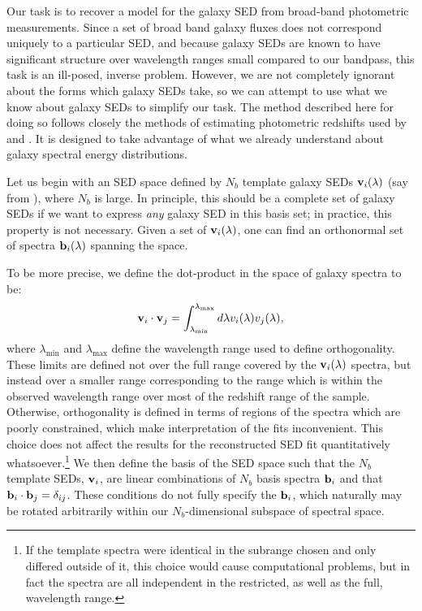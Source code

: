 \documentclass[10pt,preprint]{aastex}
\newcommand{\vv}[1]{{\bf #1}}
\begin{document}
Our task is to recover a model for the galaxy SED from broad-band
photometric measurements. Since a set of broad band galaxy fluxes does
not correspond uniquely to a particular SED, and because galaxy SEDs
are known to have significant structure over wavelength ranges small
compared to our bandpass, this task is an ill-posed, inverse
problem. However, we are not completely ignorant about the forms which
galaxy SEDs take, so we can attempt to use what we know about galaxy
SEDs to simplify our task.  The method described here for doing so
follows closely the methods of estimating photometric redshifts used
by \citet{csabai00a} and \citet{budavari00a}. It is designed to take
advantage of what we already understand about galaxy spectral energy
distributions.

Let us begin with an SED space defined by $N_b$ template galaxy SEDs
$\vv{v}_i(\lambda)$ (say from \citealt{bruzual93a}), where $N_b$ is
large. In principle, this should be a complete set of galaxy SEDs if
we want to express {\it any} galaxy SED in this basis set; in
practice, this property is not necessary.  Given a set of
$\vv{v}_i(\lambda)$, one can find an orthonormal set of spectra
$\vv{b}_i(\lambda)$ spanning the space. 

To be more precise, we define the dot-product in the space of galaxy
spectra to be:
\begin{equation}
\vv{v}_i \cdot \vv{v}_j =
\int_{\lambda_{\mathrm{min}}}^{\lambda_{\mathrm{max}}} d\lambda
v_i(\lambda) v_j(\lambda),
\end{equation}
where $\lambda_{\mathrm{min}}$ and $\lambda_{\mathrm{max}}$ define the
wavelength range used to define orthogonality. These limits are
defined not over the full range covered by the $\vv{v}_i(\lambda)$
spectra, but instead over a smaller range corresponding to the range
which is within the observed wavelength range over most of the
redshift range of the sample. Otherwise, orthogonality is defined in
terms of regions of the spectra which are poorly constrained, which
make interpretation of the fits inconvenient.  This choice does not
affect the results for the reconstructed SED fit quantitatively
whatsoever.\footnote{If the template spectra were identical in the
subrange chosen and only differed outside of it, this choice would
cause computational problems, but in fact the spectra are all
independent in the restricted, as well as the full, wavelength range.}
We then define the basis of the SED space such that the $N_b$ template
SEDs, $\vv{v}_i$, are linear combinations of $N_b$ basis spectra
$\vv{b}_i$ and that $\vv{b}_i \cdot \vv{b}_j = \delta_{ij}$. These
conditions do not fully specify the $\vv{b}_i$, which naturally may be
rotated arbitrarily within our $N_b$-dimensional subspace of spectral
space.  
\end{document}
